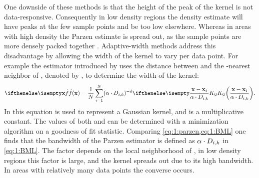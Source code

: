 	One downside of these methods is that the height of the peak of the kernel is not data-responsive. Consequently in low density regions the density estimate will have peaks at the few sample points and be too low elsewhere. Whereas in areas with high density the Parzen estimate is spread out, as the sample points are more densely packed together \cite{breiman1977variable}. Adaptive-width methods address this disadvantage by allowing the width of the kernel to vary per data point. For example the estimator introduced by \textcite{breiman1977variable} uses the distance between \varPattern[\itXis] and the \KNNK-nearest neighbor of \varPattern[\itXis], denoted by \varKNNDistance{\itXis}{\KNNK}, to determine the width of the kernel:
	\begin{equation}\label{eq:1:BML}
	 	\varEstimatedDensityFunction{\varPattern} = \frac{1}{\varNumPatterns} \sum_{\itXis = 1}^{\varNumPatterns} (\varBMLconstant \cdot \varKNNDistance{\itXis}{k})^{-\varDim} \varKernel[\varGaussian]{\frac{\varPattern - \varPattern[\itXis]}{\varBMLconstant \cdot \varKNNDistance{\itXis}{k}}}.
	\end{equation} 
	In this equation \varKernel[\varGaussian]{} is used to represent a Gaussian kernel, and \varBMLconstant is a multiplicative constant. The values of both \varBMLconstant and \KNNK can be determined with a minimization algorithm on a goodness of fit statistic. Comparing \cref{eq:1:parzen,eq:1:BML} one finds that the bandwidth \varBandwidth of the Parzen estimator is defined as $\alpha \cdot D_{i, k}$ in \cref{eq:1:BML}. The factor \varKNNDistance{\itXis}{\KNNK} depends on the local neighborhood of \varPattern[\itXis], in low density regions this factor is large, and the kernel spreads out due to its high bandwidth. In areas with relatively many data points the converse occurs.

